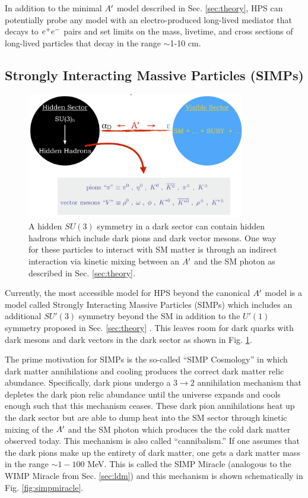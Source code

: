 In addition to the minimal $A^\prime$ model described in Sec. \ref{sec:theory}, HPS can potentially probe any model with an electro-produced long-lived mediator that decays to $e^{+}e^{-}$ pairs and set limits on the mass, livetime, and cross sections of long-lived particles that decay in the range $\sim$1-10 cm.

\subsection{Strongly Interacting Massive Particles (SIMPs)}\label{sec:simps}

\begin{figure}
    \centering
    \includegraphics[width=0.85\textwidth]{figs/upgrades/su3.png}
    \caption{A hidden $SU(3)$ symmetry in a dark sector can contain hidden hadrons which include dark pions and dark vector mesons. One way for these particles to interact with SM matter is through an indirect interaction via kinetic mixing between an $A^\prime$ and the SM photon as described in Sec. \ref{sec:theory}.}
    \label{fig:su3}
\end{figure}

Currently, the most accessible model for HPS beyond the canonical $A^\prime$ model is a model called Strongly Interacting Massive Particles (SIMPs) which includes an additional $SU'(3)$ symmetry beyond the SM in addition to the $U'(1)$ symmetry proposed in Sec. \ref{sec:theory} \cite{PhysRevLett.115.021301}. This leaves room for dark quarks with dark mesons and dark vectors in the dark sector as shown in Fig. \ref{fig:su3}. 

The prime motivation for SIMPs is the so-called ``SIMP Cosmology'' in which dark matter annihilations and cooling produces the correct dark matter relic abundance. Specifically, dark pions undergo a $3 \rightarrow 2$ annihilation mechanism that depletes the dark pion relic abundance until the universe expands and cools enough such that this mechanism ceases. These dark pion annihilations heat up the dark sector but are able to dump heat into the SM sector through kinetic mixing of the $A^\prime$ and the SM photon which produces the the cold dark matter observed today. This mechanism is also called ``cannibalism.'' If one assumes that the dark pions make up the entirety of dark matter, one gets a dark matter mass in the range $\sim 1-100$ MeV. This is called the SIMP Miracle (analogous to the WIMP Miracle from Sec. \ref{sec:ldm}) and this mechanism is shown schematically in Fig. \ref{fig:simpmiracle}. 

